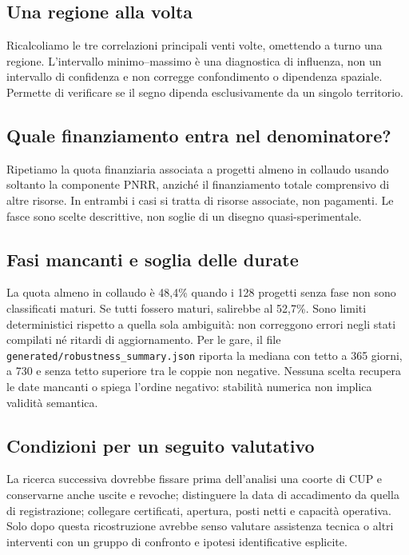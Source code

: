 \documentclass[10pt,a4paper]{article}
\begin{document}
\subsection{Una regione alla volta}
Ricalcoliamo le tre correlazioni principali venti volte, omettendo a turno una regione. L'intervallo minimo--massimo è una diagnostica di influenza, non un intervallo di confidenza e non corregge confondimento o dipendenza spaziale. Permette di verificare se il segno dipenda esclusivamente da un singolo territorio.

\begin{table}[H]
\centering
\caption{Correlazioni con la copertura 2023/24: esclusione di una regione}
\resizebox{0.94\textwidth}{!}{}
\end{table}

\subsection{Quale finanziamento entra nel denominatore?}
Ripetiamo la quota finanziaria associata a progetti almeno in collaudo usando soltanto la componente PNRR, anziché il finanziamento totale comprensivo di altre risorse. In entrambi i casi si tratta di risorse associate, non pagamenti. Le fasce sono scelte descrittive, non soglie di un disegno quasi-sperimentale.

\begin{table}[H]
\centering
\caption{Quota percentuale dei finanziamenti associata a progetti maturi}

\end{table}

\subsection{Fasi mancanti e soglia delle durate}
La quota almeno in collaudo è 48,4\% quando i 128 progetti senza fase non sono classificati maturi. Se tutti fossero maturi, salirebbe al 52,7\%. Sono limiti deterministici rispetto a quella sola ambiguità: non correggono errori negli stati compilati né ritardi di aggiornamento. Per le gare, il file \texttt{generated/robustness\_summary.json} riporta la mediana con tetto a 365 giorni, a 730 e senza tetto superiore tra le coppie non negative. Nessuna scelta recupera le date mancanti o spiega l'ordine negativo: stabilità numerica non implica validità semantica.

\subsection{Condizioni per un seguito valutativo}
La ricerca successiva dovrebbe fissare prima dell'analisi una coorte di CUP e conservarne anche uscite e revoche; distinguere la data di accadimento da quella di registrazione; collegare certificati, apertura, posti netti e capacità operativa. Solo dopo questa ricostruzione avrebbe senso valutare assistenza tecnica o altri interventi con un gruppo di confronto e ipotesi identificative esplicite.
\end{document}
